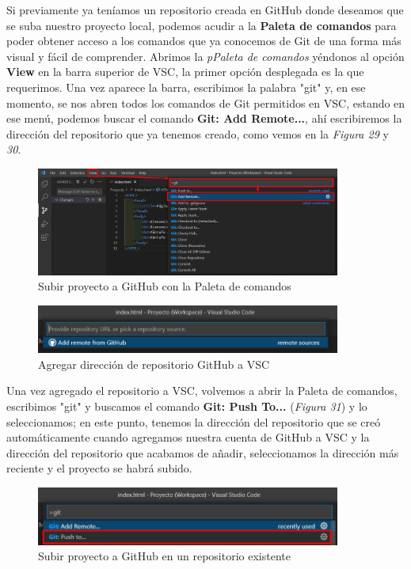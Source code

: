 Si previamente ya teníamos un repositorio creada en GitHub donde deseamos que se suba nuestro proyecto local, podemos acudir a la \textbf{Paleta de comandos} para poder obtener acceso a los comandos que ya conocemos de Git de una forma más visual y fácil de comprender. Abrimos la \textit{pPaleta de comandos} yéndonos al opción \textbf{View} en la barra superior de VSC, la primer opción desplegada es la que requerimos. Una vez aparece la barra, escribimos la palabra "git" y, en ese momento, se nos abren todos los comandos de Git permitidos en VSC, estando en ese menú, podemos buscar el comando \textbf{Git: Add Remote...}, ahí escribiremos la dirección del repositorio que ya tenemos creado, como vemos en la \textit{Figura 29} y \textit{30}.
\begin{figure}[H]
    \begin{center}
        \caption{Subir proyecto a GitHub con la Paleta de comandos}
        \label{fig: 29}
        \includegraphics[width=10cm]{capturas/subir_proyecto3.png}
    \end{center}
\end{figure}
\begin{figure}[H]
    \begin{center}
        \caption{Agregar dirección de repositorio GitHub a VSC}
        \label{fig: 30}
        \includegraphics[width=10cm]{capturas/subir_proyecto4.png}
    \end{center}
\end{figure}

Una vez agregado el repositorio a VSC, volvemos a abrir la Paleta de comandos, escribimos "git" y buscamos el comando \textbf{Git: Push To...} (\textit{Figura 31}) y lo seleccionamos; en este punto, tenemos la dirección del repositorio que se creó automáticamente cuando agregamos nuestra cuenta de GitHub a VSC y la dirección del repositorio que acabamos de añadir, seleccionamos la dirección más reciente y el proyecto se habrá subido.
\begin{figure}[H]
    \begin{center}
        \caption{Subir proyecto a GitHub en un repositorio existente}
        \label{fig: 31}
        \includegraphics[width=10cm]{capturas/subir_proyecto5.png}
    \end{center}
\end{figure}

